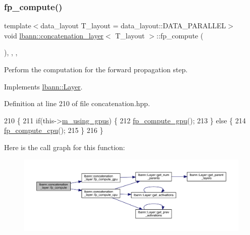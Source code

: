 \subsubsection{\texorpdfstring{fp\+\_\+compute()}{fp\_compute()}}
{\footnotesize\ttfamily template$<$data\+\_\+layout T\+\_\+layout = data\+\_\+layout\+::\+D\+A\+T\+A\+\_\+\+P\+A\+R\+A\+L\+L\+EL$>$ \\
void \hyperlink{classlbann_1_1concatenation__layer}{lbann\+::concatenation\+\_\+layer}$<$ T\+\_\+layout $>$\+::fp\+\_\+compute (\begin{DoxyParamCaption}{ }\end{DoxyParamCaption})\hspace{0.3cm}{\ttfamily [inline]}, {\ttfamily [override]}, {\ttfamily [protected]}, {\ttfamily [virtual]}}

Perform the computation for the forward propagation step. 

Implements \hyperlink{classlbann_1_1Layer_a523319dd1bd87a0612afa1912bb5aad7}{lbann\+::\+Layer}.



Definition at line 210 of file concatenation.\+hpp.


\begin{DoxyCode}
210                              \{
211     \textcolor{keywordflow}{if}(this->\hyperlink{classlbann_1_1Layer_af7881cb5eff5207c15fa835d65462e8f}{m\_using\_gpus}) \{
212       \hyperlink{classlbann_1_1concatenation__layer_afd6cb5cf50acf95c2e3ba2e365be3525}{fp\_compute\_gpu}();
213     \} \textcolor{keywordflow}{else} \{
214       \hyperlink{classlbann_1_1concatenation__layer_a53b3f53828d4982452dd6e79b8ebce50}{fp\_compute\_cpu}();
215     \}
216   \}
\end{DoxyCode}
Here is the call graph for this function\+:\nopagebreak
\begin{figure}[H]
\begin{center}
\leavevmode
\includegraphics[width=350pt]{classlbann_1_1concatenation__layer_a27938ca2422fd120cfbdf823705af01a_cgraph}
\end{center}
\end{figure}
\mbox{\label{classlbann_1_1concatenation__layer_a53b3f53828d4982452dd6e79b8ebce50}} 
